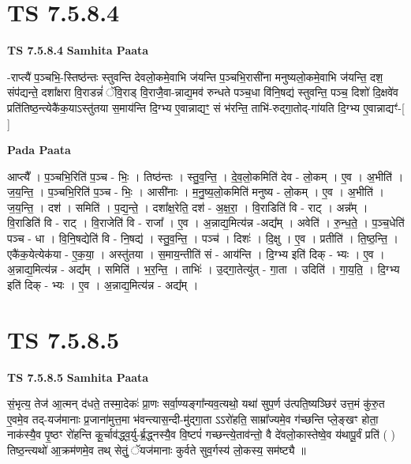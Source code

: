 \documentclass[17pt]{extarticle}
\begin{document}

\section{ TS 7.5.8.4 }

\textbf{TS 7.5.8.4 } \newline
\textbf{Samhita Paata} \newline

-राप्त्यै॑ प॒ञ्चभि॒-स्तिष्ठ॑न्तः स्तुवन्ति देवलो॒कमे॒वाभि ज॑यन्ति प॒ञ्चभि॒रासी॑ना मनुष्यलो॒कमे॒वाभि ज॑यन्ति॒ दश॒ संप॑द्यन्ते॒ दशा᳚क्षरा वि॒राडन्नं॑ ॅवि॒राड् वि॒राजै॒वा-न्नाद्य॒मव॑ रुन्धते पञ्च॒धा वि॑नि॒षद्य॑ स्तुवन्ति॒ पञ्च॒ दिशो॑ दि॒क्षवे॑व प्रति॑तिष्ठ॒न्त्येकै॑क॒याऽस्तु॑तया स॒माय॑न्ति दि॒ग्भ्य ए॒वान्नाद्यꣳ॒॒ सं भ॑रन्ति॒ ताभि॑-रुद्गा॒तोद्-गा॑यति दि॒ग्भ्य ए॒वान्नाद्यꣳ॑-[  ] \newline

\textbf{Pada Paata} \newline

आप्त्यै᳚ । प॒ञ्चभि॒रिति॑ प॒ञ्च - भिः॒ । तिष्ठ॑न्तः । स्तु॒व॒न्ति॒ । दे॒व॒लो॒कमिति॑ देव - लो॒कम् । ए॒व । अ॒भीति॑ । ज॒य॒न्ति॒ । प॒ञ्चभि॒रिति॑ प॒ञ्च - भिः॒ । आसी॑नाः । म॒नु॒ष्य॒लो॒कमिति॑ मनुष्य - लो॒कम् । ए॒व । अ॒भीति॑ । ज॒य॒न्ति॒ । दश॑ । समिति॑ । प॒द्य॒न्ते॒ । दशा᳚क्ष॒रेति॒ दश॑ - अ॒क्ष॒रा॒ । वि॒राडिति॑ वि - राट् । अन्न᳚म् । वि॒राडिति॑ वि - राट् । वि॒राजेति॑ वि - राजा᳚ । ए॒व । अ॒न्नाद्य॒मित्य॑न्न -अद्य᳚म् । अवेति॑ । रु॒न्ध॒ते॒ । प॒ञ्च॒धेति॑ पञ्च - धा । वि॒नि॒षद्येति॑ वि - नि॒षद्य॑ । स्तु॒व॒न्ति॒ । पञ्च॑ । दिशः॑ । दि॒क्षु । ए॒व । प्रतीति॑ । ति॒ष्ठ॒न्ति॒ । एकै॑क॒येत्येक॑या - ए॒क॒या॒ । अस्तु॑तया । स॒माय॒न्तीति॑ सं - आय॑न्ति । दि॒ग्भ्य इति॑ दिक् - भ्यः । ए॒व । अ॒न्नाद्य॒मित्य॑न्न - अद्य᳚म् । समिति॑ । भ॒र॒न्ति॒ । ताभिः॑ । उ॒द्गा॒तेत्यु॑त् - गा॒ता । उदिति॑ । गा॒य॒ति॒ । दि॒ग्भ्य इति॑ दिक् - भ्यः । ए॒व । अ॒न्नाद्य॒मित्य॑न्न - अद्य᳚म् ।  \newline





\section{ TS 7.5.8.5 }

\textbf{TS 7.5.8.5 } \newline
\textbf{Samhita Paata} \newline

सं॒भृत्य॒ तेज॑ आ॒त्मन् द॑धते॒ तस्मा॒देकः॑ प्रा॒णः सर्वा॒ण्यङ्गा᳚न्यव॒त्यथो॒ यथा॑ सुप॒र्ण उ॑त्पति॒ष्यञ्छिर॑ उत्त॒मं कु॑रु॒त ए॒वमे॒व तद्-यज॑मानाः प्र॒जाना॑मुत्त॒मा भ॑वन्त्यास॒न्दी-मु॑द्गा॒ता ऽऽरो॑हति॒ साम्रा᳚ज्यमे॒व ग॑च्छन्ति प्ले॒ङ्खꣳ होता॒ नाक॑स्यै॒व पृ॒ष्ठꣳ रो॑हन्ति कू॒र्चाव॑द्ध्व॒र्यु-र्ब्र॒द्ध्नस्यै॒व वि॒ष्टपं॑ गच्छन्त्ये॒ताव॑न्तो॒ वै दे॑वलो॒कास्तेष्वे॒व य॑थापू॒र्वं प्रति॑ ( ) तिष्ठ॒न्त्यथो॑ आ॒क्रम॑णमे॒व तथ् सेतुं॒ ॅयज॑मानाः कुर्वते सुव॒र्गस्य॑ लो॒कस्य॒ सम॑ष्ट्यै ॥ \newline
\end{document}
